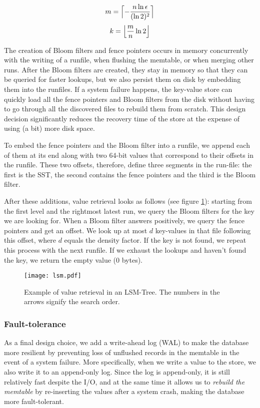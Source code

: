 $$ m = \Bigl\lceil-\frac{n\ln \epsilon}{(\ln 2)^2}\Bigr\rceil $$
$$ k = \Bigl\lfloor \frac{m}{n}\ln 2 \Bigr\rfloor$$

The creation of Bloom filters and fence pointers occurs in memory concurrently with the writing of a runfile, when flushing the memtable, or when merging other runs. After the Bloom filters are created, they stay in memory so that they can be queried for faster lookups, but we also persist them on disk by embedding them into the runfiles. If a system failure happens, the key-value store can quickly load all the fence pointers and Bloom filters from the disk without having to go through all the discovered files to rebuild them from scratch. This design decision significantly reduces the recovery time of the store at the expense of using (a bit) more disk space.

To embed the fence pointers and the Bloom filter into a runfile, we append each of them at its end along with two 64-bit values that correspond to their offsets in the runfile. These two offsets, therefore, define three segments in the run-file: the first is the SST, the second contains the fence pointers and the third is the Bloom filter.

After these additions, value retrieval looks as follows (see figure \ref{fig:lsm}): starting from the first level and the rightmost latest run, we query the Bloom filters for the key we are looking for. When a Bloom filter answers positively, we query the fence pointers and get an offset. We look up at most $d$ key-values in that file following this offset, where $d$ equals the density factor. If the key is not found, we repeat this process with the next runfile. If we exhaust the lookups and haven't found the key, we return the empty value (0 bytes).

\vspace{20px}
\begin{figure}[h]
    \centering
    \texttt{[image: lsm.pdf]}
    \caption{Example of value retrieval in an LSM-Tree. The numbers in the arrows signify the search order.}
    \label{fig:lsm}
\end{figure}
\vspace{20px}

\subsubsection{Fault-tolerance}

As a final design choice, we add a write-ahead log (WAL) to make the database more resilient by preventing loss of unflushed records in the memtable in the event of a system failure.
More specifically, when we write a value to the store, we also write it to an append-only log. Since the log is append-only, it is still relatively fast despite the I/O, and at the same time it allows us to \textit{rebuild the memtable} by re-inserting the values after a system crash, making the database more fault-tolerant. 

